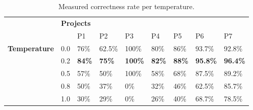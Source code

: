 \begin{table}
	\centering
	\caption{Measured correctness rate per temperature.}
	\label{table:correctnesspertemp}
	\resizebox{0.65\textwidth}{!} {
		\begin{tabular}{lllllllll}
			\toprule
			\centering
			& \multicolumn{6}{l}{\hspace{10.5em}\bfseries Projects}                                \\ %
			\multirow{3}{*}{\begin{turn}{-90}\bfseries Temperature\end{turn}} & \multicolumn{1}{l|}{}  & \multicolumn{1}{l|}{P1}       & \multicolumn{1}{l|}{P2}      &\multicolumn{1}{l|}{P3} & \multicolumn{1}{l|}{P4}   & \multicolumn{1}{l|}{P5}  & \multicolumn{1}{l|}{P6} & P7 \\ \cmidrule{2-9}
			
			& \multicolumn{1}{l|}{0.0} & \multicolumn{1}{l|}{76\%} & \multicolumn{1}{l|}{62.5\%}& \multicolumn{1}{l|}{100\%}& \multicolumn{1}{l|}{80\%}&\multicolumn{1}{l|}{86\%}&\multicolumn{1}{l|}{93.7\%}& 92.8\% \\ \cmidrule{2-9} 
			
			& \multicolumn{1}{l|}{0.2} & \multicolumn{1}{l|}{\cellcolor{green!35}\textbf{84\%}}& \multicolumn{1}{l|}{\cellcolor{green!35}\textbf{75\%}}& \multicolumn{1}{l|}{\cellcolor{green!35}\textbf{100\%}}& \multicolumn{1}{l|}{\cellcolor{green!35}\textbf{82\%}} &\multicolumn{1}{l|}{\cellcolor{green!35}\textbf{88\%}} &\multicolumn{1}{l|}{\cellcolor{green!35}\textbf{95.8\%}} & \cellcolor{green!35}\textbf{96.4\%} \\ \cmidrule{2-9} 
			
			& \multicolumn{1}{l|}{0.5} & \multicolumn{1}{l|}{57\%}& \multicolumn{1}{l|}{50\%}& \multicolumn{1}{l|}{100\%}& \multicolumn{1}{l|}{58\%} &\multicolumn{1}{l|}{68\%} &\multicolumn{1}{l|}{87.5\%} & 89.2\% \\ \cmidrule{2-9} 
			
			& \multicolumn{1}{l|}{0.8} & \multicolumn{1}{l|}{50\%}& \multicolumn{1}{l|}{37\%}& \multicolumn{1}{l|}{0\%}& \multicolumn{1}{l|}{32\%} &\multicolumn{1}{l|}{46\%} &\multicolumn{1}{l|}{62.5\%} & 85.7\% \\ \cmidrule{2-9} 
			
			& \multicolumn{1}{l|}{1.0} & \multicolumn{1}{l|}{30\%}& \multicolumn{1}{l|}{29\%}& \multicolumn{1}{l|}{0\%}& \multicolumn{1}{l|}{26\%} &\multicolumn{1}{l|}{40\%} &\multicolumn{1}{l|}{68.7\%} & 78.5\% \\ \bottomrule%
		\end{tabular}
	}
\end{table}


